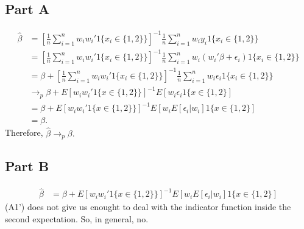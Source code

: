 \documentclass[11pt]{article} %
\begin{document}
\subsection{Part A}
\begin{align*}
\hat{\beta} &= \left[\frac{1}{n} \sum_{i=1}^n w_i w_i' 1\{ x_i \in \{1,2\} \} \right]^{-1}\frac{1}{n}\sum_{i=1}^n w_i y_i 1\{ x_i \in \{1,2\}\}\\
&= \left[\frac{1}{n} \sum_{i=1}^n w_i w_i' 1\{ x_i \in \{1,2\} \} \right]^{-1}\frac{1}{n}\sum_{i=1}^n w_i (w_i' \beta +\epsilon_i) 1\{ x_i \in \{1,2\}\}\\
&= \beta + \left[\frac{1}{n} \sum_{i=1}^n w_i w_i' 1\{ x_i \in \{1,2\} \} \right]^{-1}\frac{1}{n}\sum_{i=1}^n w_i \epsilon_i 1\{ x_i \in \{1,2\}\} \\
&\rightarrow_p \beta + E[w_iw_i'1\{x\in \{ 1,2\}\}]^{-1} E[w_i\epsilon_i1\{x\in \{ 1,2\}]\\
&=\beta + E[w_iw_i'1\{x\in \{ 1,2\}\}]^{-1} E[w_iE[\epsilon_i|w_i]1\{x\in \{ 1,2\}]\\
&= \beta.
\end{align*}
Therefore, $\hat{\beta}\rightarrow_p \beta.$
\subsection{Part B}
\begin{align*}
\hat{\beta} &=\beta + E[w_iw_i'1\{x\in \{ 1,2\}\}]^{-1} E[w_iE[\epsilon_i|w_i]1\{x\in \{ 1,2\}]
\end{align*}
(A1') does not give us enought to deal with the indicator function inside the second expectation. So, in general, no.
\end{document}
